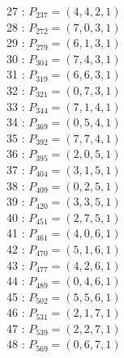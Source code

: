 \documentclass{article}
\begin{document}
{\begin{multicols}{3}
27 : $P_{237}=( 4, 4, 2, 1 )$\\
28 : $P_{272}=( 7, 0, 3, 1 )$\\
29 : $P_{279}=( 6, 1, 3, 1 )$\\
30 : $P_{304}=( 7, 4, 3, 1 )$\\
31 : $P_{319}=( 6, 6, 3, 1 )$\\
32 : $P_{321}=( 0, 7, 3, 1 )$\\
33 : $P_{344}=( 7, 1, 4, 1 )$\\
34 : $P_{369}=( 0, 5, 4, 1 )$\\
35 : $P_{392}=( 7, 7, 4, 1 )$\\
36 : $P_{395}=( 2, 0, 5, 1 )$\\
37 : $P_{404}=( 3, 1, 5, 1 )$\\
38 : $P_{409}=( 0, 2, 5, 1 )$\\
39 : $P_{420}=( 3, 3, 5, 1 )$\\
40 : $P_{451}=( 2, 7, 5, 1 )$\\
41 : $P_{461}=( 4, 0, 6, 1 )$\\
42 : $P_{470}=( 5, 1, 6, 1 )$\\
43 : $P_{477}=( 4, 2, 6, 1 )$\\
44 : $P_{489}=( 0, 4, 6, 1 )$\\
45 : $P_{502}=( 5, 5, 6, 1 )$\\
46 : $P_{531}=( 2, 1, 7, 1 )$\\
47 : $P_{539}=( 2, 2, 7, 1 )$\\
48 : $P_{569}=( 0, 6, 7, 1 )$\\
\end{multicols}


%


%


}%
\end{document}
